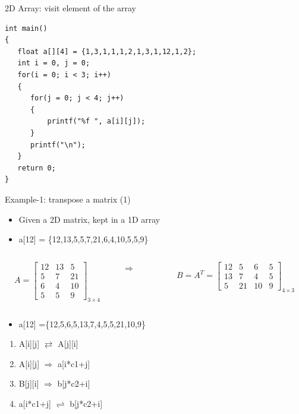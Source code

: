 \begin{frame}[fragile]{2D Array: visit element of the array}
\begin{lstlisting}[xleftmargin=0.08\linewidth, linewidth=0.85\linewidth]
int main()
{
   float a[][4] = {1,3,1,1,1,2,1,3,1,12,1,2};
   int i = 0, j = 0;
   for(i = 0; i < 3; i++)
   {
      for(j = 0; j < 4; j++)
      {
          printf("%f ", a[i][j]);
      }
      printf("\n");
   }
   return 0;
}
\end{lstlisting}
\end{frame}


\begin{frame}{Example-1: transpose a matrix (1)}
\begin{itemize}
	\item {Given a 2D matrix, kept in a 1D array}
	\item {a[12] = \{12,13,5,5,7,21,6,4,10,5,5,9\}}
\end{itemize}
\vspace{-0.1in}
\begin{columns}
\begin{column}{0.4\linewidth}
\begin{equation}
A=\left[
\begin{array}{ccc}
12 & 13 & 5 \\
5 & 7 & 21 \\
6 & 4 & 10 \\
5 & 5 & 9 
\end{array}
\right]_{3{\times}4} \nonumber
\end{equation}
\end{column}
\begin{column}{0.05\linewidth}
\begin{center}
$\Rightarrow$
\end{center}
\end{column}
\begin{column}{0.44\linewidth}
\begin{equation}
B=A^T=\left[ 
\begin{array}{cccc}
12 & 5 & 6 & 5 \\
13 & 7 & 4 & 5 \\
5 & 21 & 10 & 9
\end{array}
\right]_{4{\times}3} \nonumber
\end{equation}
\end{column}
\end{columns}
\begin{itemize}
	\item {a[12] =\{12,5,6,5,13,7,4,5,5,21,10,9\}}
\end{itemize}
\begin{enumerate}
	\item {A[i][j] $\rightleftarrows$ A[j][i]}
	\item {A[i][j] $\Rightarrow$ a[i*c1+j]}
	\item {B[j][i] $\Rightarrow$ b[j*c2+i]}
	\item {a[i*c1+j] $\rightleftharpoons$ b[j*c2+i]}
\end{enumerate}
\end{frame}

